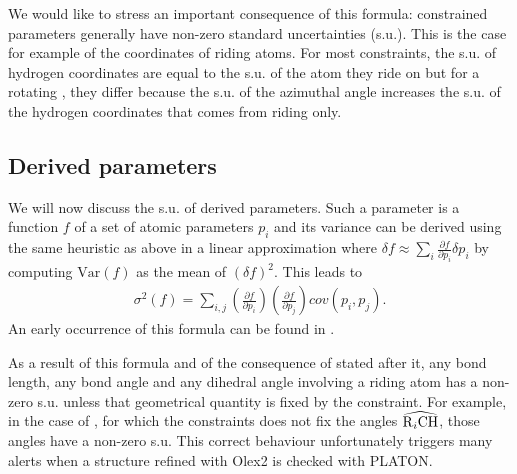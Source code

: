 \documentclass[11pt]{article}
\newcommand{\var}[1]{\mathrm{Var}\left(#1\right)}
\newcommand{\partialder}[2]{\frac{\partial #1}{\partial #2}}
\begin{document}
We would like to stress an important consequence of this formula: constrained parameters generally have non-zero standard uncertainties (s.u.). This is the case for example of the coordinates of riding atoms. For most constraints, the s.u. of hydrogen coordinates are equal to the s.u. of the atom they ride on but  for a rotating , they differ because the s.u. of the azimuthal angle increases the s.u. of the hydrogen coordinates that comes from riding only.

\subsection{Derived parameters}

We will now discuss the s.u. of derived parameters. Such a parameter is a function $f$ of a set of atomic parameters $p_i$ and its variance can be derived using the same heuristic as above in a linear approximation where $\delta f \approx \sum_i \partialder{f}{p_i} \delta p_i$ by computing $\var{f}$ as the mean of $(\delta f)^2$. This leads to
\begin{align}
\sigma^2(f) = \sum_{i,j}{\left(\partialder{f}{p_i}\right) \left(\partialder{f}{p_j}\right) cov(p_i,p_j)}.
\label{eqn:sigma_f}
\end{align}
An early occurrence of this formula can be found in .

As a result of this formula and of the consequence of  stated after it, any bond length, any bond angle and any dihedral angle involving a riding atom has a non-zero s.u. unless that geometrical quantity is fixed by the constraint. For example, in the case of , for which the constraints does not fix the angles $\widehat{\ce{R$_i$CH}}$, those angles have a non-zero s.u. This correct behaviour unfortunately triggers many alerts when a structure refined with Olex2 is checked with PLATON. 
\end{document}

